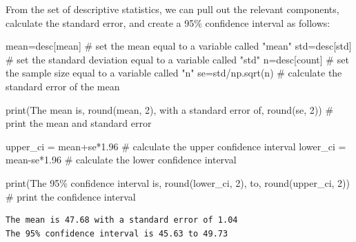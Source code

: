 \documentclass[
  letterpaper,
  DIV=11,
  numbers=noendperiod]{scrreprt}
\newenvironment{Shaded}{\begin{snugshade}}{\end{snugshade}}
\newcommand{\BuiltInTok}[1]{\textcolor[rgb]{0.00,0.23,0.31}{#1}}
\newcommand{\CommentTok}[1]{\textcolor[rgb]{0.37,0.37,0.37}{#1}}
\newcommand{\DecValTok}[1]{\textcolor[rgb]{0.68,0.00,0.00}{#1}}
\newcommand{\FloatTok}[1]{\textcolor[rgb]{0.68,0.00,0.00}{#1}}
\newcommand{\NormalTok}[1]{\textcolor[rgb]{0.00,0.23,0.31}{#1}}
\newcommand{\OperatorTok}[1]{\textcolor[rgb]{0.37,0.37,0.37}{#1}}
\newcommand{\SpecialCharTok}[1]{\textcolor[rgb]{0.37,0.37,0.37}{#1}}
\newcommand{\StringTok}[1]{\textcolor[rgb]{0.13,0.47,0.30}{#1}}
\begin{document}
From the set of descriptive statistics, we can pull out the relevant
components, calculate the standard error, and create a 95\% confidence
interval as follows:

\begin{Shaded}
\begin{Highlighting}[]
\NormalTok{mean}\OperatorTok{=}\NormalTok{desc[}\StringTok{\textquotesingle{}mean\textquotesingle{}}\NormalTok{] }\CommentTok{\# set the mean equal to a variable called "mean"}
\NormalTok{std}\OperatorTok{=}\NormalTok{desc[}\StringTok{\textquotesingle{}std\textquotesingle{}}\NormalTok{] }\CommentTok{\# set the standard deviation equal to a variable called "std"}
\NormalTok{n}\OperatorTok{=}\NormalTok{desc[}\StringTok{\textquotesingle{}count\textquotesingle{}}\NormalTok{] }\CommentTok{\# set the sample size equal to a variable called "n"}
\NormalTok{se}\OperatorTok{=}\NormalTok{std}\OperatorTok{/}\NormalTok{np.sqrt(n) }\CommentTok{\# calculate the standard error of the mean}

\BuiltInTok{print}\NormalTok{(}\StringTok{\textquotesingle{}The mean is\textquotesingle{}}\NormalTok{, }\BuiltInTok{round}\NormalTok{(mean, }\DecValTok{2}\NormalTok{), }\StringTok{\textquotesingle{}with a standard error of\textquotesingle{}}\NormalTok{, }\BuiltInTok{round}\NormalTok{(se, }\DecValTok{2}\NormalTok{)) }\CommentTok{\# print the mean and standard error}

\NormalTok{upper\_ci }\OperatorTok{=}\NormalTok{ mean}\OperatorTok{+}\NormalTok{se}\OperatorTok{*}\FloatTok{1.96} \CommentTok{\# calculate the upper confidence interval}
\NormalTok{lower\_ci }\OperatorTok{=}\NormalTok{ mean}\OperatorTok{{-}}\NormalTok{se}\OperatorTok{*}\FloatTok{1.96} \CommentTok{\# calculate the lower confidence interval}

\BuiltInTok{print}\NormalTok{(}\StringTok{\textquotesingle{}The 95}\SpecialCharTok{\% c}\StringTok{onfidence interval is\textquotesingle{}}\NormalTok{, }\BuiltInTok{round}\NormalTok{(lower\_ci, }\DecValTok{2}\NormalTok{), }\StringTok{\textquotesingle{}to\textquotesingle{}}\NormalTok{, }\BuiltInTok{round}\NormalTok{(upper\_ci, }\DecValTok{2}\NormalTok{)) }\CommentTok{\# print the confidence interval}
\end{Highlighting}
\end{Shaded}

\begin{verbatim}
The mean is 47.68 with a standard error of 1.04
The 95% confidence interval is 45.63 to 49.73
\end{verbatim}
\end{document}
